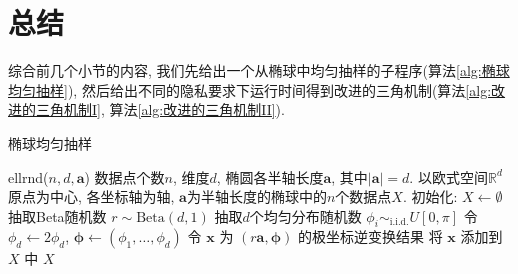 \section{总结} %
\label{sec:总结}
综合前几个小节的内容, 我们先给出一个从椭球中均匀抽样的子程序(算法\ref{alg:椭球均匀抽样}), 然后给出不同的隐私要求下运行时间得到改进的三角机制(算法\ref{alg:改进的三角机制I}, 算法\ref{alg:改进的三角机制II}).

\begin{algorithm}[hbtp]
  \caption{椭球均匀抽样}\label{alg:椭球均匀抽样}
  \begin{algorithmic}[1]
    \INTERFACE ellrnd($n, d, \mathbf{a}$)
    \REQUIRE 数据点个数$n$, 维度$d$, 椭圆各半轴长度$\mathbf{a}$, 其中$|\mathbf{a}| = d$.
    \ENSURE 以欧式空间$\mathbb R^d$原点为中心, 各坐标轴为轴, $\mathbf{a}$为半轴长度的椭球中的$n$个数据点$X$.
    \STATE 初始化: $X \leftarrow \emptyset$
      \STATE 抽取Beta随机数 $r \sim \mathrm{Beta}(d, 1)$
      \STATE 抽取$d$个均匀分布随机数 $\phi_i \sim_{\text{i.i.d.}} U[0, \pi]$
      \STATE 令 $\phi_d \leftarrow 2 \phi_d$, $\boldsymbol{\phi} \leftarrow (\phi_1, \dots, \phi_d)$
      \STATE 令 $ \mathbf{x}$ 为 $(r\mathbf{a}, \boldsymbol{\phi})$ 的极坐标逆变换结果
      \STATE 将 $\mathbf{x}$ 添加到 $X$ 中
    \ENDFOR
    \RETURN $X$
  \end{algorithmic}
\end{algorithm}
